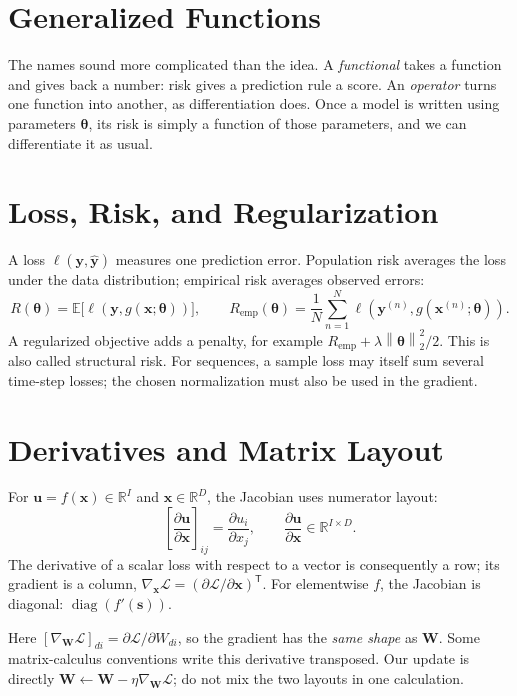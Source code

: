 \documentclass[11pt, oneside]{book}
\newcommand{\R}{\mathbb{R}}
\newcommand{\E}{\mathbb{E}}              %
\newcommand{\norm}[1]{\left\lVert #1 \right\rVert}
\newcommand{\T}{^{\mathsf{T}}}           %
\newcommand{\diag}{\operatorname{diag}}
\newcommand{\loss}{\mathcal{L}}          %
\newcommand{\params}{\boldsymbol{\theta}}   %
\let\originalsection\section
\renewcommand{\section}{\Needspace{7\baselineskip}\originalsection}
\begin{document}
\section{Generalized Functions}\label{sec:source-0-8}
The names sound more complicated than the idea. A \emph{functional} takes a function and gives back a number: risk gives a prediction rule a score. An \emph{operator} turns one function into another, as differentiation does. Once a model is written using parameters $\params$, its risk is simply a function of those parameters, and we can differentiate it as usual.

\section{Loss, Risk, and Regularization}\label{sec:source-0-9}
A loss $\ell(\mathbf{y},\widehat{\mathbf{y}})$ measures one prediction error. Population risk averages the loss under the data distribution; empirical risk averages observed errors:
\[
 R(\params)=\E\bigl[\ell(\mathbf{y},g(\mathbf{x};\params))\bigr],\qquad
 R_{\mathrm{emp}}(\params)=\frac1N\sum_{n=1}^N
 \ell(\mathbf{y}^{(n)},g(\mathbf{x}^{(n)};\params)).
\]
A regularized objective adds a penalty, for example $R_{\mathrm{emp}}+\lambda\norm{\params}_2^2/2$. This is also called structural risk. For sequences, a sample loss may itself sum several time-step losses; the chosen normalization must also be used in the gradient.

\section{Derivatives and Matrix Layout}\label{sec:source-0-10}
For $\mathbf{u}=f(\mathbf{x})\in\R^I$ and $\mathbf{x}\in\R^D$, the Jacobian uses numerator layout:
\[
 \left[\frac{\partial\mathbf{u}}{\partial\mathbf{x}}\right]_{ij}
 =\frac{\partial u_i}{\partial x_j},\qquad
 \frac{\partial\mathbf{u}}{\partial\mathbf{x}}\in\R^{I\times D}.
\]
The derivative of a scalar loss with respect to a vector is consequently a row; its gradient is a column, $\nabla_{\mathbf{x}}\loss=(\partial\loss/\partial\mathbf{x})\T$. For elementwise $f$, the Jacobian is diagonal: $\diag(f'(\mathbf{s}))$.

\begin{notebox}[title={Matrix gradients: use the shape needed for the update}]
Here $[\nabla_{\mathbf{W}}\loss]_{di}=\partial\loss/\partial W_{di}$, so the gradient has the \emph{same shape} as $\mathbf{W}$. Some matrix-calculus conventions write this derivative transposed. Our update is directly $\mathbf{W}\leftarrow\mathbf{W}-\eta\nabla_{\mathbf{W}}\loss$; do not mix the two layouts in one calculation.
\end{notebox}
\end{document}
